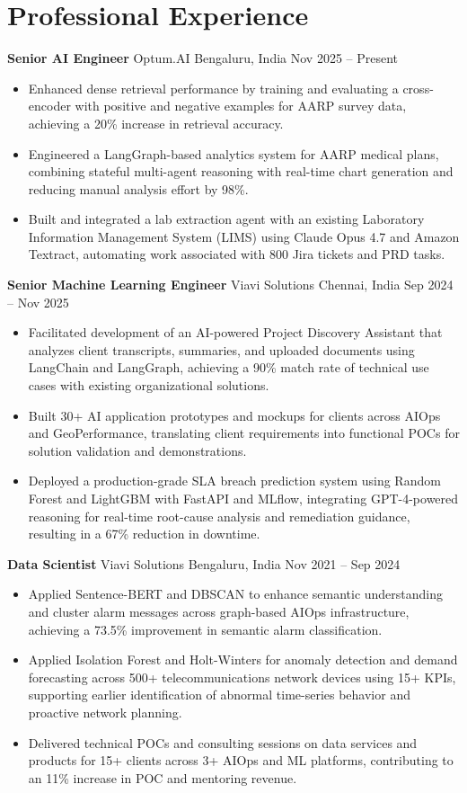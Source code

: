 \documentclass[10pt,a4paper]{article}
\newcommand{\role}[4]{\textbf{#1} \textbar{} #2 \hfill #3 \textbar{} #4\par}
\begin{document}
\section{Professional Experience}
\role{Senior AI Engineer}{Optum.AI}{Bengaluru, India}{Nov 2025 -- Present}
\begin{itemize}
  \item Enhanced dense retrieval performance by training and evaluating a cross-encoder with positive and negative examples for AARP survey data, achieving a 20\% increase in retrieval accuracy.
  \item Engineered a LangGraph-based analytics system for AARP medical plans, combining stateful multi-agent reasoning with real-time chart generation and reducing manual analysis effort by 98\%.
  \item Built and integrated a lab extraction agent with an existing Laboratory Information Management System (LIMS) using Claude Opus 4.7 and Amazon Textract, automating work associated with 800 Jira tickets and PRD tasks.
\end{itemize}
\vspace{3pt}
\role{Senior Machine Learning Engineer}{Viavi Solutions}{Chennai, India}{Sep 2024 -- Nov 2025}
\begin{itemize}
  \item Facilitated development of an AI-powered Project Discovery Assistant that analyzes client transcripts, summaries, and uploaded documents using LangChain and LangGraph, achieving a 90\% match rate of technical use cases with existing organizational solutions.
  \item Built 30+ AI application prototypes and mockups for clients across AIOps and GeoPerformance, translating client requirements into functional POCs for solution validation and demonstrations.
  \item Deployed a production-grade SLA breach prediction system using Random Forest and LightGBM with FastAPI and MLflow, integrating GPT-4-powered reasoning for real-time root-cause analysis and remediation guidance, resulting in a 67\% reduction in downtime.
\end{itemize}
\vspace{3pt}
\role{Data Scientist}{Viavi Solutions}{Bengaluru, India}{Nov 2021 -- Sep 2024}
\begin{itemize}
  \item Applied Sentence-BERT and DBSCAN to enhance semantic understanding and cluster alarm messages across graph-based AIOps infrastructure, achieving a 73.5\% improvement in semantic alarm classification.
  \item Applied Isolation Forest and Holt-Winters for anomaly detection and demand forecasting across 500+ telecommunications network devices using 15+ KPIs, supporting earlier identification of abnormal time-series behavior and proactive network planning.
  \item Delivered technical POCs and consulting sessions on data services and products for 15+ clients across 3+ AIOps and ML platforms, contributing to an 11\% increase in POC and mentoring revenue.
\end{itemize}
\end{document}
